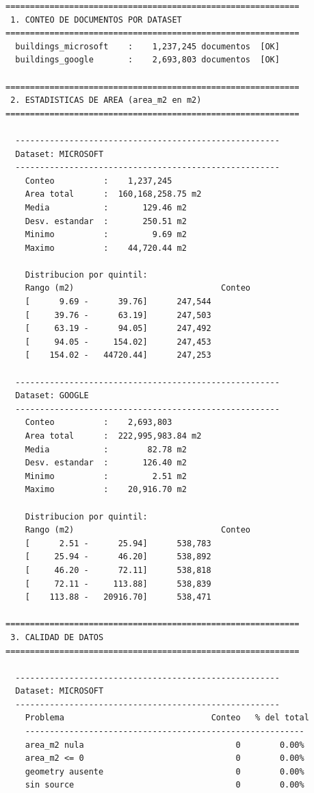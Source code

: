 \documentclass[12pt,a4paper]{article}
\begin{document}
\begin{lstlisting}[style=evidence]
============================================================
 1. CONTEO DE DOCUMENTOS POR DATASET
============================================================
  buildings_microsoft    :    1,237,245 documentos  [OK]
  buildings_google       :    2,693,803 documentos  [OK]

============================================================
 2. ESTADISTICAS DE AREA (area_m2 en m2)
============================================================

  ------------------------------------------------------
  Dataset: MICROSOFT
  ------------------------------------------------------
    Conteo          :    1,237,245
    Area total      :  160,168,258.75 m2
    Media           :       129.46 m2
    Desv. estandar  :       250.51 m2
    Minimo          :         9.69 m2
    Maximo          :    44,720.44 m2

    Distribucion por quintil:
    Rango (m2)                              Conteo
    [      9.69 -      39.76]      247,544
    [     39.76 -      63.19]      247,503
    [     63.19 -      94.05]      247,492
    [     94.05 -     154.02]      247,453
    [    154.02 -   44720.44]      247,253

  ------------------------------------------------------
  Dataset: GOOGLE
  ------------------------------------------------------
    Conteo          :    2,693,803
    Area total      :  222,995,983.84 m2
    Media           :        82.78 m2
    Desv. estandar  :       126.40 m2
    Minimo          :         2.51 m2
    Maximo          :    20,916.70 m2

    Distribucion por quintil:
    Rango (m2)                              Conteo
    [      2.51 -      25.94]      538,783
    [     25.94 -      46.20]      538,892
    [     46.20 -      72.11]      538,818
    [     72.11 -     113.88]      538,839
    [    113.88 -   20916.70]      538,471

============================================================
 3. CALIDAD DE DATOS
============================================================

  ------------------------------------------------------
  Dataset: MICROSOFT
  ------------------------------------------------------
    Problema                              Conteo   % del total
    ---------------------------------------------------------
    area_m2 nula                               0        0.00%
    area_m2 <= 0                               0        0.00%
    geometry ausente                           0        0.00%
    sin source                                 0        0.00%


\end{lstlisting}
\end{document}
